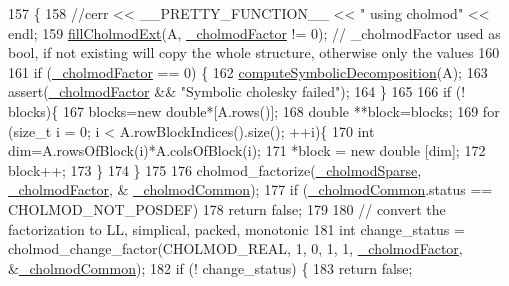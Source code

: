 \begin{DoxyCode}
157     \{
158       \textcolor{comment}{//cerr << \_\_PRETTY\_FUNCTION\_\_ << " using cholmod" << endl;}
159       \hyperlink{classg2o_1_1LinearSolverCholmod_a4b1e18e870b5663f45900dea3bba9155}{fillCholmodExt}(A, \hyperlink{classg2o_1_1LinearSolverCholmod_a674a54287f98130c4aab303508ab945b}{\_cholmodFactor} != 0); \textcolor{comment}{// \_cholmodFactor used as bool,
       if not existing will copy the whole structure, otherwise only the values}
160 
161       \textcolor{keywordflow}{if} (\hyperlink{classg2o_1_1LinearSolverCholmod_a674a54287f98130c4aab303508ab945b}{\_cholmodFactor} == 0) \{
162         \hyperlink{classg2o_1_1LinearSolverCholmod_a40a0f991ae3bb914f2313b55c514640d}{computeSymbolicDecomposition}(A);
163         assert(\hyperlink{classg2o_1_1LinearSolverCholmod_a674a54287f98130c4aab303508ab945b}{\_cholmodFactor} && \textcolor{stringliteral}{"Symbolic cholesky failed"});
164       \}
165 
166       \textcolor{keywordflow}{if} (! blocks)\{
167         blocks=\textcolor{keyword}{new} \textcolor{keywordtype}{double}*[A.rows()];
168         \textcolor{keywordtype}{double} **block=blocks;
169         \textcolor{keywordflow}{for} (\textcolor{keywordtype}{size\_t} i = 0; i < A.rowBlockIndices().size(); ++i)\{
170           \textcolor{keywordtype}{int} dim=A.rowsOfBlock(i)*A.colsOfBlock(i);
171           *block = \textcolor{keyword}{new} \textcolor{keywordtype}{double} [dim];
172           block++;
173         \}
174       \}
175 
176       cholmod\_factorize(\hyperlink{classg2o_1_1LinearSolverCholmod_aefbdba58c18dc9eac831eb3d7c24fa18}{\_cholmodSparse}, \hyperlink{classg2o_1_1LinearSolverCholmod_a674a54287f98130c4aab303508ab945b}{\_cholmodFactor}, &
      \hyperlink{classg2o_1_1LinearSolverCholmod_ae7def9c6bf341e0d2f3a3936121fefa1}{\_cholmodCommon});
177       \textcolor{keywordflow}{if} (\hyperlink{classg2o_1_1LinearSolverCholmod_ae7def9c6bf341e0d2f3a3936121fefa1}{\_cholmodCommon}.status == CHOLMOD\_NOT\_POSDEF)
178         \textcolor{keywordflow}{return} \textcolor{keyword}{false};
179 
180       \textcolor{comment}{// convert the factorization to LL, simplical, packed, monotonic}
181       \textcolor{keywordtype}{int} change\_status = cholmod\_change\_factor(CHOLMOD\_REAL, 1, 0, 1, 1, 
      \hyperlink{classg2o_1_1LinearSolverCholmod_a674a54287f98130c4aab303508ab945b}{\_cholmodFactor}, &\hyperlink{classg2o_1_1LinearSolverCholmod_ae7def9c6bf341e0d2f3a3936121fefa1}{\_cholmodCommon});
182       \textcolor{keywordflow}{if} (! change\_status) \{
183         \textcolor{keywordflow}{return} \textcolor{keyword}{false};

\end{DoxyCode}
